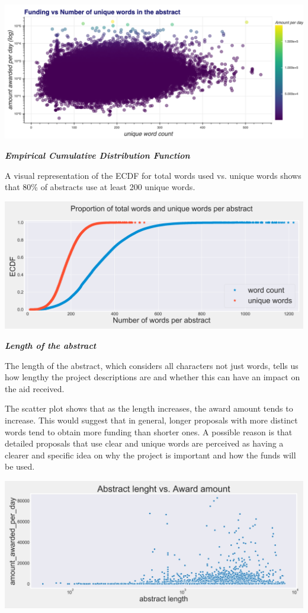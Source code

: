 \documentclass[11pt, oneside]{article}   	%
\begin{document}
\includegraphics[width=\textwidth]{uniquewordsawards}

\textbf{\emph{Empirical Cumulative Distribution Function}}

A visual representation of the ECDF for total words used vs. unique words shows that 80\% of abstracts use at least 200 unique words.

\includegraphics[width=\textwidth]{ecdf}

\textbf{\emph{Length of the abstract}}

The length of the abstract, which considers all characters not just words, tells us how lengthy the project descriptions are and whether this can have an impact on the aid received.

The scatter plot shows that as the length increases, the award amount tends to increase. This would suggest that in general, longer proposals with more distinct words tend to obtain more funding than shorter ones. A possible reason is that detailed proposals that use clear and unique words are perceived as having a clearer and specific idea on why the project is important and how the funds will be used.

\includegraphics[width=\textwidth]{abstractlengthscatterplot}
\end{document}
